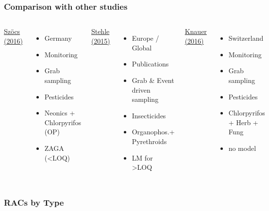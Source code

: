 \documentclass[
	12pt
	]{beamer}
\begin{document}
\begin{frame}
\frametitle{Comparison with other studies}
	\begin{columns}[T]
	    \underline{Szöcs (2016)}
	    \begin{itemize}
        	\item Germany \\[1.5em]
        	\item Monitoring
        	\item Grab sampling \vspace{1.2em}
        	\item Pesticides
        	\item Neonics + Chlorpyrifos (OP)
        	\item ZAGA (\textless LOQ)
        \end{itemize}
	    \underline{Stehle (2015)}
	    \begin{itemize}
        	\item Europe / Global
        	\item Publications
        	\item Grab \& Event driven sampling
        	\item Insecticides
        	\item Organophos.+ Pyrethroids \\[1.5em]
        	\item LM for \textgreater LOQ
        \end{itemize}
	    \underline{Knauer (2016)}
	    \begin{itemize}
        	\item Switzerland \\[1.5em]
        	\item Monitoring
        	\item Grab sampling \vspace{1.2em}
        	\item Pesticides
        	\item Chlorpyrifos + Herb + Fung \\[1.5em]
        	\item no model
        \end{itemize}
	\end{columns}
\end{frame}


\begin{frame}
\frametitle{RACs by Type}
	\begin{adjustbox}{max totalsize={\textwidth}{0.95\textheight}}
				
	\end{adjustbox}
\end{frame}
\end{document}
